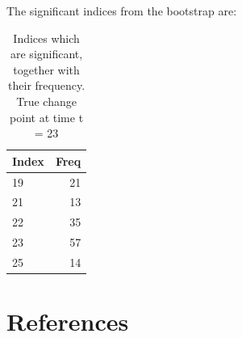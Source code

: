 \documentclass[smallextended]{svjour3}       %
\begin{document}
The significant indices from the bootstrap are:

\begin{longtable}[t]{lr}
\caption{\label{tab:chunk_12}Indices which are significant, together with their frequency. True change point at time t = 23}\\
\toprule
Index & Freq\\
\midrule
19 & 21\\
21 & 13\\
22 & 35\\
23 & 57\\
25 & 14\\
\bottomrule
\end{longtable}

\section{References}\label{references}



\end{document}
